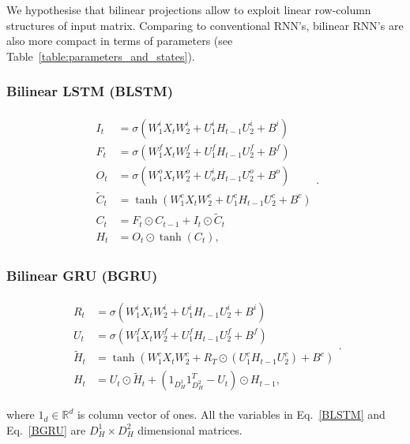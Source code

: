 \documentclass[a4paper,11pt]{article}
\begin{document}
We hypothesise that bilinear projections allow to exploit linear row-column structures of input matrix. Comparing to conventional RNN's, bilinear RNN's are also more compact in terms of parameters (see Table~\ref{table:parameters_and_states}).


\subsubsection{Bilinear LSTM (BLSTM)} 
\begin{align}
\begin{split}
\label{BLSTM}
I_{t} &=\sigma(W_{1}^{i}X_{t}W_{2}^{i} + U_{1}^{i}H_{t-1}U_{2}^{i}  +  B^{i})\\
F_{t} &=\sigma(W_{1}^{f}X_{t}W_{2}^{f} + U_{1}^{f}H_{t-1}U_{2}^{f}  +  B^{f})\\
O_{t} &=\sigma(W_{1}^{o}X_{t}W_{2}^{o} + U_{o}^{i}H_{t-1}U_{2}^{o}  +  B^{o})\\
\tilde{C}_{t} &=\tanh(W_{1}^{c}X_{t}W_{2}^{c} + U_{1}^{c}H_{t-1}U_{2}^{c}  +  B^{c})\\
C_{t} &= F_{t} \odot C_{t-1} + I_{t} \odot \tilde{C}_{t}\\
H_{t} &= O_{t}\odot \tanh(C_{t}),
\end{split}.
\end{align}

\subsubsection{Bilinear GRU (BGRU)} 
\begin{align}
\begin{split}
\label{BGRU}
R_{t} &=\sigma(W_{1}^{i}X_{t}W_{2}^{i} + U_{1}^{i}H_{t-1}U_{2}^{i}  +  B^{i})\\
U_{t} &=\sigma(W_{1}^{f}X_{t}W_{2}^{f} + U_{1}^{f}H_{t-1}U_{2}^{f}  +  B^{f})\\
\tilde{H}_{t} &= \tanh(W_{1}^{c}X_{t}W_{2}^{c} + R_{T} \odot (U_{1}^{c}H_{t-1}U_{2}^{c})  +  B^{c})\\
H_{t} &= U_{t}\odot \tilde{H}_{t} + (1_{D_{H}^{1}}1_{D_{H}^{2}}^{T} - U_{t})\odot H_{t-1},
\end{split}.
\end{align}

\noindent where $1_{d} \in \mathbb{R}^{d}$ is column vector of ones. All the variables in Eq.~\eqref{BLSTM} and Eq.~\eqref{BGRU} are $D_{H}^{1} \times D_{H}^{2}$ dimensional matrices.
\end{document}
